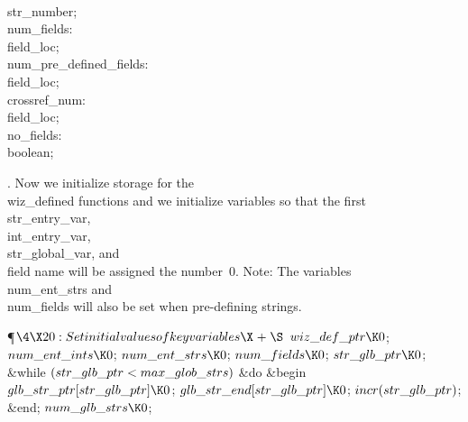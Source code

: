 \\{str\_number};\2\6
\4\\{num\_fields}: \\{field\_loc};\6
\4\\{num\_pre\_defined\_fields}: \\{field\_loc};\6
\4\\{crossref\_num}: \\{field\_loc};\6
\4\\{no\_fields}: \\{boolean};\par
\fi

.
Now we initialize storage for the \\{wiz\_defined} functions and we
initialize variables so that the first \\{str\_entry\_var},
\\{int\_entry\_var}, \\{str\_global\_var}, and \\{field} name will be assigned
the number~0.  Note: The variables \\{num\_ent\_strs} and \\{num\_fields}
will also be set when pre-defining strings.

\Y\P$\4\X20:Set initial values of key variables\X\mathrel{+}\S$\6
$\\{wiz\_def\_ptr}\K0$;\5
$\\{num\_ent\_ints}\K0$;\5
$\\{num\_ent\_strs}\K0$;\5
$\\{num\_fields}\K0$;\5
$\\{str\_glb\_ptr}\K0$;\6
\&{while} $(\\{str\_glb\_ptr}<\\{max\_glob\_strs})$ \1\&{do}\6
\&{begin} $\\{glb\_str\_ptr}[\\{str\_glb\_ptr}]\K0$;\5
$\\{glb\_str\_end}[\\{str\_glb\_ptr}]\K0$;\5
$\\{incr}(\\{str\_glb\_ptr})$;\6
\&{end};\2\6
$\\{num\_glb\_strs}\K0$;\par
\fi

